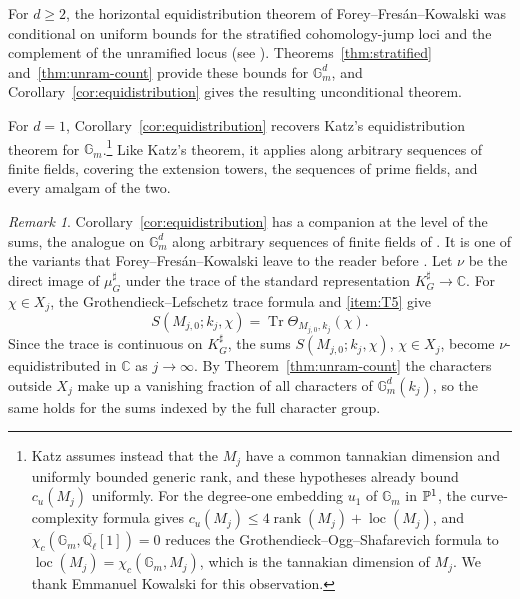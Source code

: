 \documentclass[12pt,reqno]{amsart}
\theoremstyle{definition}
\theoremstyle{plain}
\theoremstyle{definition}
\theoremstyle{remark}
\newtheorem{rem}[para]{Remark}
\newcommand{\bbC}{\mathbb{C}}  \newcommand{\bbD}{\mathbb{D}}
\newcommand{\bbG}{\mathbb{G}}  \newcommand{\bbH}{\mathbb{H}}
\newcommand{\bbQ}{\mathbb{Q}}  \newcommand{\bbR}{\mathbb{R}}
\newcommand{\ol}[1]{\overline{#1}}
\newcommand{\Ql}{\bbQ_{\ell}}
\newcommand{\Gm}{\bbG_m}
\newcommand{\cu}{c_u}
\begin{document}
For \(d\ge2\), the horizontal equidistribution theorem of Forey--Fres\'an--Kowalski was conditional on
uniform bounds for the stratified cohomology-jump loci and the complement of the unramified locus (see
\cite[Th.~4.19, Rem.~4.20(2)]{ForeyFresanKowalski2021}).  Theorems~\ref{thm:stratified}
and~\ref{thm:unram-count} provide these bounds for \(\Gm^d\), and
Corollary~\ref{cor:equidistribution} gives the resulting unconditional theorem.

For \(d=1\), Corollary~\ref{cor:equidistribution} recovers Katz's equidistribution theorem
\cite[Th.~28.1]{Katz2012} for \(\Gm\).\footnote{Katz assumes instead that the \(M_j\) have a common
tannakian dimension and uniformly bounded generic rank, and these hypotheses already bound
\(\cu(M_j)\) uniformly.  For the degree-one embedding \(u_1\) of \(\Gm\) in \(\mathbb{P}^1\), the
curve-complexity formula \cite[Th.~7.3(2)]{SFFK23} gives
\(\cu(M_j)\le4\operatorname{rank}(M_j)+\operatorname{loc}(M_j)\), and \(\chi_c(\Gm,\ol\Ql[1])=0\)
reduces the Grothendieck--Ogg--Shafarevich formula to
\(\operatorname{loc}(M_j)=\chi_c(\Gm,M_j)\), which is the tannakian dimension of \(M_j\).  We thank
Emmanuel Kowalski for this observation.}  Like Katz's theorem, it applies along arbitrary sequences of
finite fields, covering the extension towers, the sequences of prime fields, and every amalgam of the
two.

\begin{rem}
\label{rem:sum-equidistribution}
Corollary~\ref{cor:equidistribution} has a companion at the level of the sums, the analogue on
\(\Gm^d\) along arbitrary sequences of finite fields of \cite[Th.~4.8]{ForeyFresanKowalski2021}.  It is
one of the variants that Forey--Fres\'an--Kowalski leave to the reader before
\cite[Th.~4.19]{ForeyFresanKowalski2021}.  Let \(\nu\) be the direct image of \(\mu_G^\sharp\) under the
trace of the standard representation \(K_G^\sharp\to\bbC\).  For \(\chi\in X_j\), the
Grothendieck--Lefschetz trace formula and \ref{item:T5} give
\[
        S(M_{j,0};k_j,\chi)=\operatorname{Tr}\Theta_{M_{j,0},k_j}(\chi).
\]
Since the trace is continuous on \(K_G^\sharp\), the sums \(S(M_{j,0};k_j,\chi)\), \(\chi\in X_j\),
become \(\nu\)-equidistributed in \(\bbC\) as \(j\to\infty\).  By Theorem~\ref{thm:unram-count} the
characters outside \(X_j\) make up a vanishing fraction of all characters of \(\Gm^d(k_j)\), so the
same holds for the sums indexed by the full character group.
\end{rem}
\end{document}
